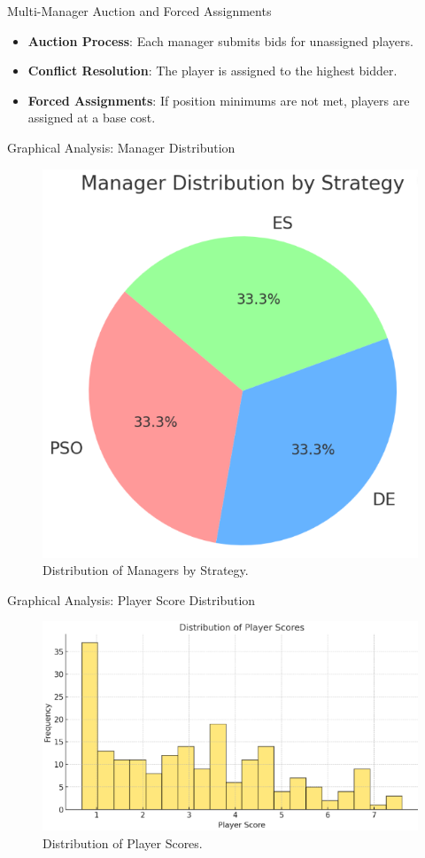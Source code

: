 \documentclass{beamer}
\begin{document}
	\begin{frame}{Multi-Manager Auction and Forced Assignments}
		\begin{itemize}
			\item \textbf{Auction Process}: Each manager submits bids for unassigned players.
			\item \textbf{Conflict Resolution}: The player is assigned to the highest bidder.
			\item \textbf{Forced Assignments}: If position minimums are not met, players are assigned at a base cost.
		\end{itemize}
	\end{frame}
	
	\begin{frame}{Graphical Analysis: Manager Distribution}
		\begin{figure}[H]
			\centering
			\includegraphics[width=0.6\linewidth]{plot/manager_distribution.png}
			\caption{Distribution of Managers by Strategy.}
		\end{figure}
	\end{frame}
	
	\begin{frame}{Graphical Analysis: Player Score Distribution}
		\begin{figure}[H]
			\centering
			\includegraphics[width=0.8\linewidth]{plot/player_score_distribution.png}
			\caption{Distribution of Player Scores.}
		\end{figure}
	\end{frame}
	
\end{document}
